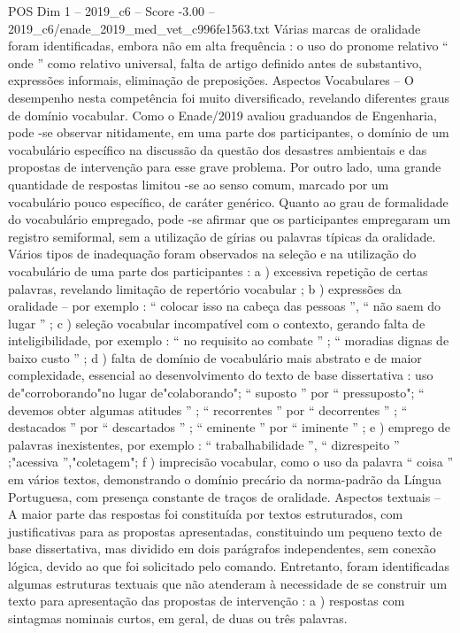 \begin{textsample}{POS Dim 1 – 2019\_c6 – Score -3.00 – 2019\_c6/enade\_2019\_med\_vet\_c996fe1563.txt}
Várias marcas de oralidade foram identificadas, embora não em alta frequência : o uso do pronome relativo “ onde ” como relativo universal, falta de artigo definido antes de substantivo, expressões informais, eliminação de preposições.
Aspectos Vocabulares – O desempenho nesta competência foi muito diversificado, revelando diferentes graus de domínio vocabular.
Como o Enade/2019 avaliou graduandos de Engenharia, pode -se observar nitidamente, em uma parte dos participantes, o domínio de um vocabulário específico na discussão da questão dos desastres ambientais e das propostas de intervenção para esse grave problema.
Por outro lado, uma grande quantidade de respostas limitou -se ao senso comum, marcado por um vocabulário pouco específico, de caráter genérico.
Quanto ao grau de formalidade do vocabulário empregado, pode -se afirmar que os participantes empregaram um registro semiformal, sem a utilização de gírias ou palavras típicas da oralidade.
Vários tipos de inadequação foram observados na seleção e na utilização do vocabulário de uma parte dos participantes : a ) excessiva repetição de certas palavras, revelando limitação de repertório vocabular ; b ) expressões da oralidade – por exemplo : “ colocar isso na cabeça das pessoas ”, “ não saem do lugar ” ; c ) seleção vocabular incompatível com o contexto, gerando falta de inteligibilidade, por exemplo : “ no requisito ao combate ” ; “ moradias dignas de baixo custo ” ; d ) falta de domínio de vocabulário mais abstrato e de maior complexidade, essencial ao desenvolvimento do texto de base dissertativa : uso de"corroborando"no lugar de"colaborando"; “ suposto ” por “ pressuposto"; “ devemos obter algumas atitudes ” ; “ recorrentes ” por “ decorrentes ” ; “ destacados ” por “ descartados ” ; “ eminente ” por “ iminente ” ; e ) emprego de palavras inexistentes, por exemplo : “ trabalhabilidade ”, “ dizrespeito ” ;"acessiva ”,"coletagem"; f ) imprecisão vocabular, como o uso da palavra “ coisa ” em vários textos, demonstrando o domínio precário da norma-padrão da Língua Portuguesa, com presença constante de traços de oralidade.
Aspectos textuais – A maior parte das respostas foi constituída por textos estruturados, com justificativas para as propostas apresentadas, constituindo um pequeno texto de base dissertativa, mas dividido em dois parágrafos independentes, sem conexão lógica, devido ao que foi solicitado pelo comando.
Entretanto, foram identificadas algumas estruturas textuais que não atenderam à necessidade de se construir um texto para apresentação das propostas de intervenção : a ) respostas com sintagmas nominais curtos, em geral, de duas ou três palavras.

\end{textsample}

